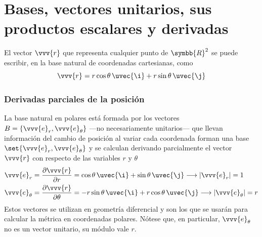 \section{Bases, vectores unitarios, sus productos escalares y derivadas}
El vector $\vvv{r}$ que representa cualquier punto de $\symbb{R}^2$ se puede escribir, en
la base natural de coordenadas cartesianas, como
\begin{equation}
  \vvv{r} = r\cos\theta\,\uvec{\i} + r\sin\theta\,\uvec{\j}
\end{equation}
\subsubsection{Derivadas parciales de la posición}
La base natural en polares está formada por los vectores
$B = \{\vvv{e}_r, \vvv{e}_{\theta}\}$ ---no necesariamente unitarios--- que llevan
información del cambio de posición al variar cada coordenada forman una base
$\set{\vvv{e}_r, \vvv{e}_\theta}$ y se calculan derivando parcialmente el vector
$\vvv{r}$ con respecto de las variables $r$ y $\theta$
\begin{subequations}
\begin{align}
  \vvv{e}_r
  &=
    \dfrac{\partial\vvv{r}}{\partial r}
    = \cos\theta\,\uvec{\i} + \sin\theta\,\uvec{\j}
    \longrightarrow
    |\vvv{e}_r| = 1\\
  \vvv{e}_\theta
  &=
    \dfrac{\partial\vvv{r}}{\partial\theta}
    = -r\sin\theta\,\uvec{\i} + r\cos\theta\,\uvec{\j}
    \longrightarrow
    |\vvv{e}_\theta| = r\\    
\end{align}
\end{subequations}
Estos vectores se utilizan en geometría diferencial y son los que se usarán para
calcular la métrica en coordenadas polares. Nótese que, en particular, $\vvv{e}_\theta$ no es un vector unitario, su módulo vale $r$.

